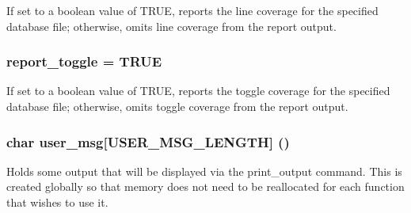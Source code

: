 If set to a boolean value of TRUE, reports the line coverage for the specified database file; otherwise, omits line coverage from the report output. 
\subsubsection{ {\bf report\_\-toggle} = TRUE}\label{report_8c_a4}


If set to a boolean value of TRUE, reports the toggle coverage for the specified database file; otherwise, omits toggle coverage from the report output. 
\subsubsection{\setlength{\rightskip}{0pt plus 5cm}char {\bf user\_\-msg}[USER\_\-MSG\_\-LENGTH] ()}\label{report_8c_a0}


Holds some output that will be displayed via the print\_\-output command. This is created globally so that memory does not need to be reallocated for each function that wishes to use it. 